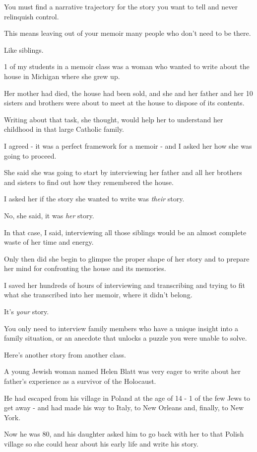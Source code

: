 \documentclass{book}
\numberwithin{equation}{section}
\begin{document}
You must find a narrative trajectory for the story you want to tell and never relinquish control.

This means leaving out of your memoir many people who don't need to be there.

Like siblings.

%
1 of my students in a memoir class was a woman who wanted to write about the house in Michigan where she grew up.

Her mother had died, the house had been sold, and she and her father and her 10 sisters and brothers were about to meet at the house to dispose of its contents.

Writing about that task, she thought, would help her to understand her childhood in that large Catholic family.

I agreed - it was a perfect framework for a memoir - and I asked her how she was going to proceed.

%
She said she was going to start by interviewing her father and all her brothers and sisters to find out how they remembered the house.

I asked her if the story she wanted to write was \textit{their} story.

No, she said, it was \textit{her} story.

In that case, I said, interviewing all those siblings would be an almost complete waste of her time and energy.

Only then did she begin to glimpse the proper shape of her story and to prepare her mind for confronting the house and its memories.

I saved her hundreds of hours of interviewing and transcribing and trying to fit what she transcribed into her memoir, where it didn't belong.

It's \textit{your} story.

You only need to interview family members who have a unique insight into a family situation, or an anecdote that unlocks a puzzle you were unable to solve.

%
Here's another story from another class.

%
A young Jewish woman named Helen Blatt was very eager to write about her father's experience as a survivor of the Holocaust.

He had escaped from his village in Poland at the age of 14 - 1 of the few Jews to get away - and had made his way to Italy, to New Orleans and, finally, to New York.

Now he was 80, and his daughter asked him to go back with her to that Polish village so she could hear about his early life and write his story.
\end{document}
